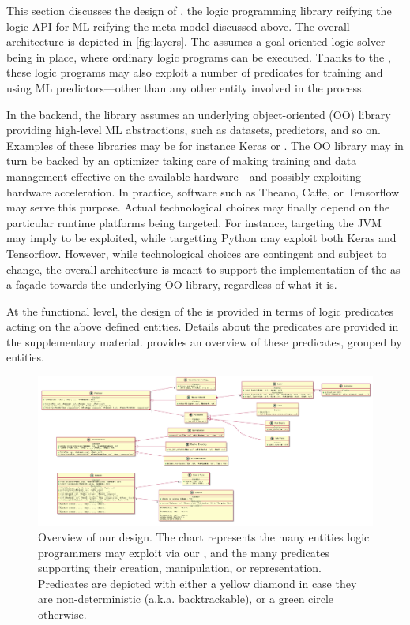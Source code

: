 \documentclass[runningheads]{llncs}
\begin{document}
This section discusses the design of \mllib, the logic programming library reifying the logic API for ML reifying the meta-model discussed above.
%
The overall architecture is depicted in \cref{fig:layers}.
%
The \mllib{} assumes a goal-oriented logic solver being in place, where ordinary logic programs can be executed.
%
Thanks to the \mllib{}, these logic programs may also exploit a number of predicates for training and using ML predictors---other than any other entity involved in the process.

In the backend, the library assumes an underlying object-oriented (OO) library providing high-level ML abstractions, such as datasets, predictors, and so on.
%
Examples of these libraries may be for instance Keras \cite{chollet2015keras} or \deeplearningforj{} \cite{DL4J}.
%
The OO library may in turn be backed by an optimizer taking care of making training and data management effective on the available hardware---and possibly exploiting hardware acceleration.
%
In practice, software such as Theano, Caffe, or Tensorflow may serve this purpose.
%
Actual technological choices may finally depend on the particular runtime platforms being targeted.
%
For instance, targeting the JVM may imply \deeplearningforj{} to be exploited, while targetting Python may exploit both Keras and Tensorflow.
%
However, while technological choices are contingent and subject to change, the overall architecture is meant to support the implementation of the \mllib{} as a façade towards the underlying OO library, regardless of what it is.

At the functional level, the design of the \mllib{} is provided in terms of logic predicates acting on the above defined entities.
%
Details about the predicates are provided in the supplementary material.
%
 provides an overview of these predicates, grouped by entities.

    \begin{figure}
        \centering
        \includegraphics[width=\linewidth]{figures/entities.pdf}
        \caption{Overview of our \mllib{} design. The chart represents the many entities logic programmers may exploit via our \mllib{}, and the many predicates supporting their creation, manipulation, or representation. Predicates are depicted with either a yellow diamond in case they are non-deterministic (a.k.a. backtrackable), or a green circle otherwise.}
        \label{fig:design-overview}
    \end{figure}
\end{document}
